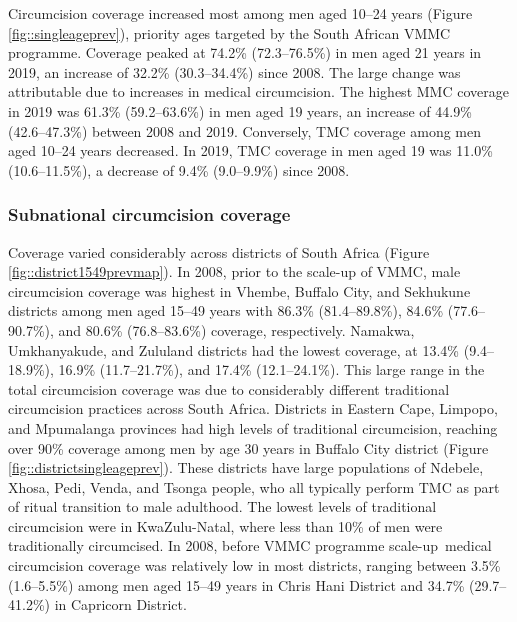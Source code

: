 \documentclass{article}
\begin{document}
Circumcision coverage increased most among men aged 10--24 years (Figure \ref{fig::singleageprev}), priority ages targeted by the South African VMMC programme. Coverage peaked at 74.2\% (72.3--76.5\%) in men aged 21 years in 2019, an increase of 32.2\% (30.3--34.4\%) since 2008. The large change was attributable due to increases in medical circumcision. The highest MMC coverage in 2019 was 61.3\% (59.2--63.6\%) in men aged 19 years, an increase of 44.9\% (42.6--47.3\%) between 2008 and 2019. Conversely, TMC coverage among men aged 10--24 years decreased. In 2019, TMC coverage in men aged 19 was 11.0\% (10.6--11.5\%), a decrease of 9.4\% (9.0--9.9\%) since 2008.


\subsubsection*{Subnational circumcision coverage}



Coverage varied considerably across districts of South Africa (Figure \ref{fig::district1549prevmap}). In 2008, prior to the scale-up of VMMC, male circumcision coverage was highest in Vhembe, Buffalo City, and Sekhukune districts among men aged 15--49 years with 86.3\% (81.4--89.8\%), 84.6\% (77.6--90.7\%), and 80.6\% (76.8--83.6\%) coverage, respectively. Namakwa, Umkhanyakude, and Zululand districts had the lowest coverage, at 13.4\% (9.4--18.9\%), 16.9\% (11.7--21.7\%), and 17.4\% (12.1--24.1\%). This large range in the total circumcision coverage was due to considerably different traditional circumcision practices across South Africa. Districts in Eastern Cape, Limpopo, and Mpumalanga provinces had high levels of traditional circumcision, reaching over 90\% coverage among men by age 30 years in Buffalo City district (Figure \ref{fig::districtsingleageprev}). These districts have large populations of Ndebele, Xhosa, Pedi, Venda, and Tsonga people, who all typically perform TMC as part of ritual transition to male adulthood. The lowest levels of traditional circumcision were in KwaZulu-Natal, where less than 10\% of men were traditionally circumcised. In 2008, before VMMC programme scale-up\, medical circumcision coverage was relatively low in most districts, ranging between 3.5\% (1.6--5.5\%) among men aged 15--49 years in Chris Hani District and 34.7\% (29.7--41.2\%) in Capricorn District.
\end{document}
